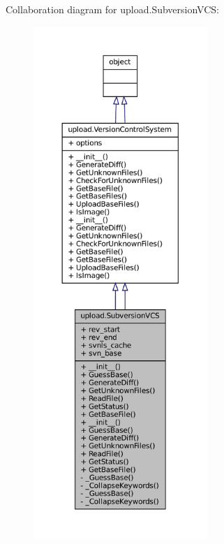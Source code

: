 Collaboration diagram for upload.\+Subversion\+V\+CS\+:
\nopagebreak
\begin{figure}[H]
\begin{center}
\leavevmode
\includegraphics[height=550pt]{classupload_1_1SubversionVCS__coll__graph}
\end{center}
\end{figure}
